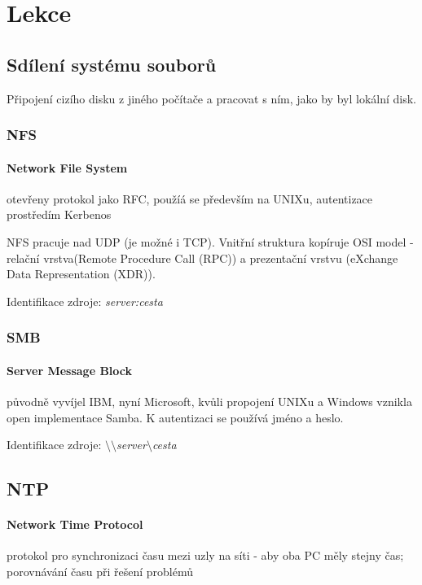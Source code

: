 \documentclass[10pt,a4paper]{article}
\begin{document}
\newpage

\section{Lekce}

\subsection{Sdílení systému souborů}

Připojení cizího disku z jiného počítače a pracovat s ním, jako by byl lokální disk.

\subsubsection{NFS}

\paragraph{Network File System} otevřeny protokol jako RFC, použíá se především na UNIXu, autentizace prostředím Kerbenos

NFS pracuje nad UDP (je možné i TCP). Vnitřní struktura kopíruje OSI model - relační vrstva(Remote Procedure Call (RPC)) a prezentační vrstvu (eXchange Data Representation (XDR)).

Identifikace zdroje: \textit{server:cesta}

\subsubsection{SMB}

\paragraph{Server Message Block} původně vyvíjel IBM, nyní Microsoft, kvůli propojení UNIXu a Windows vznikla open implementace Samba. K autentizaci se používá jméno a heslo.

Identifikace zdroje: \textit{$\setminus\setminus$server$\setminus$cesta}

\subsection{NTP}

\paragraph{Network Time Protocol} protokol pro synchronizaci času mezi uzly na síti - aby oba PC měly stejny čas; porovnávání času při řešení problémů
\end{document}
